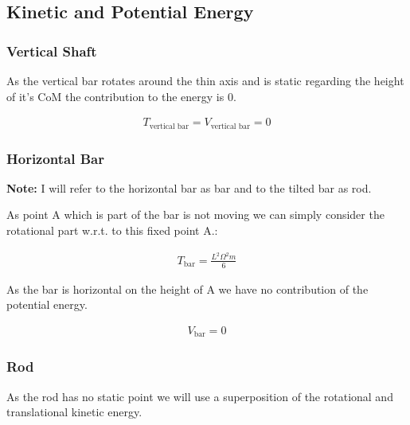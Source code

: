 \subsection{Kinetic and Potential Energy}
\subsubsection{Vertical Shaft}
As the vertical bar rotates around the thin axis and is static regarding the height of it's CoM the contribution to the energy is 0.

\begin{equation}
    \begin{split}
        T_\text{vertical bar} =  V_\text{vertical bar} = 0
    \end{split}
\end{equation}
\subsubsection{Horizontal Bar}
\textbf{Note: } I will refer to the horizontal bar as bar and to the tilted bar as rod.

As point A which is part of the bar is not moving we can simply consider the rotational part w.r.t. to this fixed point A.:

\begin{equation}
    \begin{split}
        T_\text{bar} =  \frac{L^2\Omega ^2m}{6}
    \end{split}
\end{equation}

As the bar is horizontal on the height of A we have no contribution of the potential energy.

\begin{equation}
    \begin{split}
        V_\text{bar} = 0
    \end{split}
\end{equation}

\subsubsection{Rod}
As the rod has no static point we will use a superposition of the rotational and translational kinetic energy.

